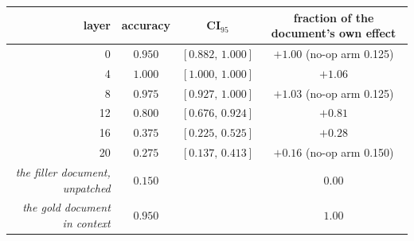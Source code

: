 \begin{tabular}{@{}rccc@{}}
\toprule
layer & accuracy & CI$_{95}$ & fraction of the document's own effect \\
\midrule
0 & $0.950$ & $[0.882,\,1.000]$ & $+1.00$ \quad\tiny(no-op arm 0.125) \\
4 & $1.000$ & $[1.000,\,1.000]$ & $+1.06$ \\
8 & $0.975$ & $[0.927,\,1.000]$ & $+1.03$ \quad\tiny(no-op arm 0.125) \\
12 & $0.800$ & $[0.676,\,0.924]$ & $+0.81$ \\
16 & $0.375$ & $[0.225,\,0.525]$ & $+0.28$ \\
20 & $0.275$ & $[0.137,\,0.413]$ & $+0.16$ \quad\tiny(no-op arm 0.150) \\
\midrule
\emph{the filler document, unpatched} & $0.150$ & & $0.00$ \\
\emph{the gold document in context} & $0.950$ & & $1.00$ \\
\bottomrule
\end{tabular}
